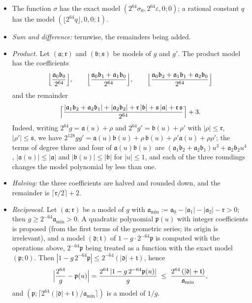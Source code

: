 \documentclass[11pt,reqno]{amsart}
\theoremstyle{definition}
\numberwithin{equation}{section}
\begin{document}
\begin{itemize}
  \item The function $\sigma$ has the exact model $(2^{64}\sigma_0,2^{64}\varepsilon,0;0)$; a rational constant $q$ has the model $(\lfloor2^{64}q\rfloor,0,0;1)$.
  \item \emph{Sum and difference:} termwise, the remainders being added.
  \item \emph{Product.} Let $(\mathfrak{a};\mathfrak{r})$ and $(\mathfrak{b};\mathfrak{s})$ be models of $g$ and $g'$. The product model has the coefficients
  \[
    \Bigl\lfloor\frac{\mathfrak{a}_0\mathfrak{b}_0}{2^{64}}\Bigr\rfloor,\qquad\Bigl\lfloor\frac{\mathfrak{a}_0\mathfrak{b}_1+\mathfrak{a}_1\mathfrak{b}_0}{2^{64}}\Bigr\rfloor,\qquad\Bigl\lfloor\frac{\mathfrak{a}_0\mathfrak{b}_2+\mathfrak{a}_1\mathfrak{b}_1+\mathfrak{a}_2\mathfrak{b}_0}{2^{64}}\Bigr\rfloor
  \]
  and the remainder
  \[
    \Bigl\lceil\frac{|\mathfrak{a}_1\mathfrak{b}_2+\mathfrak{a}_2\mathfrak{b}_1|+|\mathfrak{a}_2\mathfrak{b}_2|+\mathfrak{r}\,|\mathfrak{b}|+\mathfrak{s}\,|\mathfrak{a}|+\mathfrak{r}\,\mathfrak{s}}{2^{64}}\Bigr\rceil+3 .
  \]
  Indeed, writing $2^{64}g=\mathfrak{a}(u)+\rho$ and $2^{64}g'=\mathfrak{b}(u)+\rho'$ with $|\rho|\le\mathfrak{r}$, $|\rho'|\le\mathfrak{s}$, we have $2^{128}gg'=\mathfrak{a}(u)\mathfrak{b}(u)+\rho\,\mathfrak{b}(u)+\rho'\mathfrak{a}(u)+\rho\rho'$; the terms of degree three and four of $\mathfrak{a}(u)\mathfrak{b}(u)$ are $(\mathfrak{a}_1\mathfrak{b}_2+\mathfrak{a}_2\mathfrak{b}_1)u^3+\mathfrak{a}_2\mathfrak{b}_2u^4$, $|\mathfrak{a}(u)|\le|\mathfrak{a}|$ and $|\mathfrak{b}(u)|\le|\mathfrak{b}|$ for $|u|\le1$, and each of the three roundings changes the model polynomial by less than one.
  \item \emph{Halving:} the three coefficients are halved and rounded down, and the remainder is $\lceil\mathfrak{r}/2\rceil+2$.
  \item \emph{Reciprocal.} Let $(\mathfrak{a};\mathfrak{r})$ be a model of $g$ with $\mathfrak{a}_{\min}:=\mathfrak{a}_0-|\mathfrak{a}_1|-|\mathfrak{a}_2|-\mathfrak{r}>0$; then $g\ge2^{-64}\mathfrak{a}_{\min}>0$. A quadratic polynomial $\mathfrak{p}(u)$ with integer coefficients is proposed (from the first terms of the geometric series; its origin is irrelevant), and a model $(\mathfrak{d};\mathfrak{t})$ of $1-g\cdot2^{-64}\mathfrak{p}$ is computed with the operations above, $2^{-64}\mathfrak{p}$ being treated as a function with the exact model $(\mathfrak{p};0)$. Then $|1-g\,2^{-64}\mathfrak{p}|\le2^{-64}(|\mathfrak{d}|+\mathfrak{t})$, hence
  \[
    \Bigl|\frac{2^{64}}{g}-\mathfrak{p}(u)\Bigr|=\frac{2^{64}\,|1-g\,2^{-64}\mathfrak{p}(u)|}{g}\;\le\;\frac{2^{64}\,(|\mathfrak{d}|+\mathfrak{t})}{\mathfrak{a}_{\min}} ,
  \]
  and $(\mathfrak{p};\lceil2^{64}(|\mathfrak{d}|+\mathfrak{t})/\mathfrak{a}_{\min}\rceil)$ is a model of $1/g$.
\end{itemize}
\end{document}

